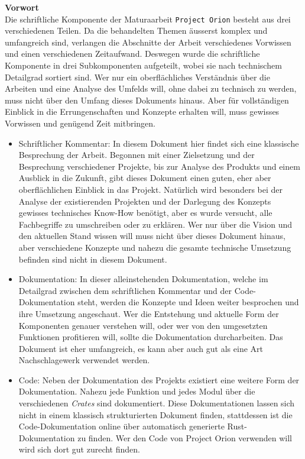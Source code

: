 \documentclass[11pt]{article}
\begin{document}
\textbf{Vorwort}\\
Die schriftliche Komponente der Maturaarbeit \texttt{Project Orion} besteht aus
drei verschiedenen Teilen. Da die behandelten Themen äusserst komplex
und umfangreich sind, verlangen die Abschnitte der Arbeit
verschiedenes Vorwissen und einen verschiedenen Zeitaufwand. Deswegen
wurde die schriftliche Komponente in drei Subkomponenten aufgeteilt,
wobei sie nach technischem Detailgrad sortiert sind. Wer nur ein
oberflächliches Verständnis über die Arbeiten und eine Analyse des
Umfelds will, ohne dabei zu technisch zu werden, muss nicht über den
Umfang dieses Dokuments hinaus. Aber für vollständigen Einblick in die
Errungenschaften und Konzepte erhalten will, muss gewisses Vorwissen
und genügend Zeit mitbringen.
\begin{itemize}
\item Schriftlicher Kommentar: In diesem Dokument hier findet sich eine
klassische Besprechung der Arbeit. Begonnen mit einer Zielsetzung
und der Besprechung verschiedener Projekte, bis zur Analyse des
Produkts und einem Ausblick in die Zukunft, gibt dieses Dokument
einen guten, eher aber oberflächlichen Einblick in das Projekt.
Natürlich wird besonders bei der Analyse der existierenden Projekten
und der Darlegung des Konzepts gewisses technisches Know-How
benötigt, aber es wurde versucht, alle Fachbegriffe zu umschreiben
oder zu erklären. Wer nur über die Vision und den aktuellen Stand
wissen will muss nicht über dieses Dokument hinaus, aber
verschiedene Konzepte und nahezu die gesamte technische Umsetzung
befinden sind nicht in diesem Dokument.
\item Dokumentation: In dieser alleinstehenden Dokumentation, welche im
Detailgrad zwischen dem schriftlichen Kommentar und der
Code-Dokumentation steht, werden die Konzepte und Ideen weiter
besprochen und ihre Umsetzung angeschaut. Wer die Entstehung und
aktuelle Form der Komponenten genauer verstehen will, oder wer von
den umgesetzten Funktionen profitieren will, sollte die
Dokumentation durcharbeiten. Das Dokument ist eher umfangreich, es
kann aber auch gut als eine Art Nachschlagewerk verwendet werden.
\item Code: Neben der Dokumentation des Projekts existiert eine weitere
Form der Dokumentation. Nahezu jede Funktion und jedes Modul über
die verschiedenen \emph{Crates} sind dokumentiert. Diese Dokumentationen
lassen sich nicht in einem klassisch strukturierten Dokument finden,
stattdessen ist die Code-Dokumentation online über automatisch
generierte Rust-Dokumentation zu finden. Wer den Code von Project
Orion verwenden will wird sich dort gut zurecht finden.
\end{itemize}
\newpage
\end{document}
